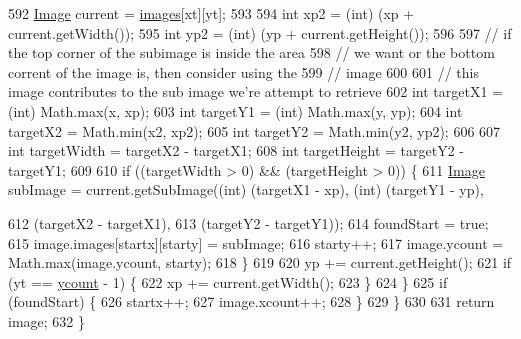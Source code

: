 \begin{DoxyCode}
592                 \mbox{\hyperlink{classorg_1_1newdawn_1_1slick_1_1_image_a2c047fa669a8387f6c2d9bde33b3ee04}{Image}} current = \mbox{\hyperlink{classorg_1_1newdawn_1_1slick_1_1_big_image_a297fc524b2aef82e75e23a59c6f4102f}{images}}[xt][yt];
593                 
594                 \textcolor{keywordtype}{int} xp2 = (int) (xp + current.getWidth());
595                 \textcolor{keywordtype}{int} yp2 = (int) (yp + current.getHeight());
596                 
597                 \textcolor{comment}{// if the top corner of the subimage is inside the area}
598                 \textcolor{comment}{// we want or the bottom corrent of the image is, then consider using the}
599                 \textcolor{comment}{// image}
600                 
601                 \textcolor{comment}{// this image contributes to the sub image we're attempt to retrieve}
602                 \textcolor{keywordtype}{int} targetX1 = (int) Math.max(x, xp);
603                 \textcolor{keywordtype}{int} targetY1 = (int) Math.max(y, yp);
604                 \textcolor{keywordtype}{int} targetX2 = Math.min(x2, xp2);
605                 \textcolor{keywordtype}{int} targetY2 = Math.min(y2, yp2);
606                 
607                 \textcolor{keywordtype}{int} targetWidth = targetX2 - targetX1;
608                 \textcolor{keywordtype}{int} targetHeight = targetY2 - targetY1;
609                 
610                 \textcolor{keywordflow}{if} ((targetWidth > 0) && (targetHeight > 0)) \{
611                     \mbox{\hyperlink{classorg_1_1newdawn_1_1slick_1_1_image_a2c047fa669a8387f6c2d9bde33b3ee04}{Image}} subImage = current.getSubImage((\textcolor{keywordtype}{int}) (targetX1 - xp), (\textcolor{keywordtype}{int}) (targetY1 - yp),
       
612                                                         (targetX2 - targetX1), 
613                                                         (targetY2 - targetY1));
614                     foundStart = \textcolor{keyword}{true};
615                     image.images[startx][starty] = subImage;
616                     starty++;
617                     image.ycount = Math.max(image.ycount, starty);
618                 \}
619                 
620                 yp += current.getHeight();
621                 \textcolor{keywordflow}{if} (yt == \mbox{\hyperlink{classorg_1_1newdawn_1_1slick_1_1_big_image_a699c6b87723d356a7062f79c35c6be5a}{ycount}} - 1) \{
622                     xp += current.getWidth();
623                 \}
624             \}
625             \textcolor{keywordflow}{if} (foundStart) \{
626                 startx++;
627                 image.xcount++;
628             \}
629         \}
630         
631         \textcolor{keywordflow}{return} image;
632     \}
\end{DoxyCode}
\mbox{\label{classorg_1_1newdawn_1_1slick_1_1_big_image_a9578a34140605c613f610f6f733a91d4}} 
